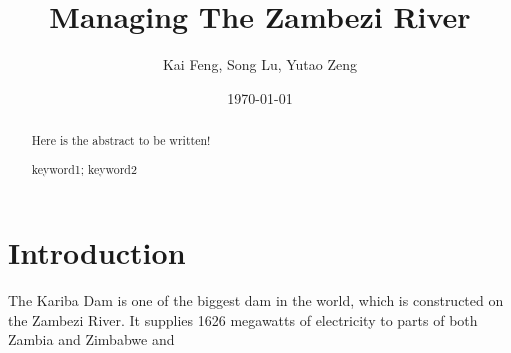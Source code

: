 \documentclass{mcmthesis}
\title{Managing The Zambezi River}
\author{Kai Feng, Song Lu, Yutao Zeng}
\date{\today}
\begin{document}
\begin{abstract}
Here is the abstract to be written!
\begin{keywords}
keyword1; keyword2
\end{keywords}
\end{abstract}
\maketitle
\section{Introduction}
The Kariba Dam is one of the biggest dam in the world, which is constructed on the Zambezi River. It supplies 1626 megawatts of electricity to parts of both Zambia and Zimbabwe and \\


\end{document}
